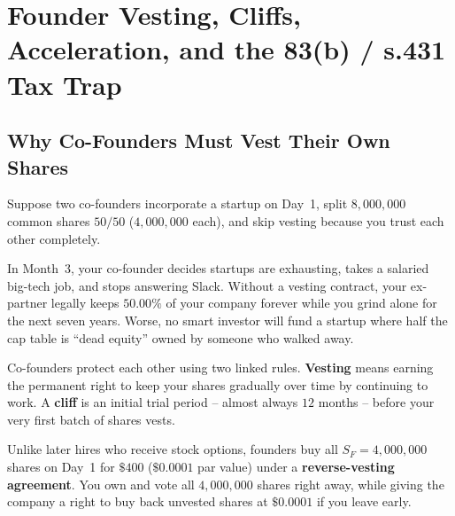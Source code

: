 \section{Founder Vesting, Cliffs, Acceleration, and the 83(b) / s.431 Tax Trap}
\label{sec:cofounder-vesting}

\subsection{Why Co-Founders Must Vest Their Own Shares}
\label{subsec:why-founders-vest}
\label{subsec:reverse-vesting-cliff}

Suppose two co-founders incorporate a startup on Day~1, split $8{,}000{,}000$ common shares $50 / 50$ ($4{,}000{,}000$ each), and skip vesting because you trust each other completely.

In Month~3, your co-founder decides startups are exhausting, takes a salaried big-tech job, and stops answering Slack. Without a vesting contract, your ex-partner legally keeps $50.00\%$ of your company forever while you grind alone for the next seven years. Worse, no smart investor will fund a startup where half the cap table is ``dead equity'' owned by someone who walked away.

Co-founders protect each other using two linked rules. \textbf{Vesting} means earning the permanent right to keep your shares gradually over time by continuing to work. A \textbf{cliff} is an initial trial period -- almost always $12$ months -- before your very first batch of shares vests.

Unlike later hires who receive stock options, founders buy all $S_F = 4{,}000{,}000$ shares on Day~1 for $\$400$ ($\$0.0001$ par value) under a \textbf{reverse-vesting agreement}. You own and vote all $4{,}000{,}000$ shares right away, while giving the company a right to buy back unvested shares at $\$0.0001$ if you leave early.

